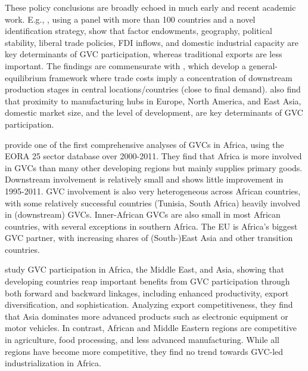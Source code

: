 \documentclass[a4paper]{article}
\begin{document}
These policy conclusions are broadly echoed in much early and recent academic work. E.g., \citet{fernandes2022determinants}, using a panel with more than 100 countries and a novel identification strategy, show that factor endowments, geography, political stability, liberal trade policies, FDI inflows, and domestic industrial capacity are key determinants of GVC participation, whereas traditional exports are less important. The findings are commensurate with \citet{antras2020geography}, which develop a general-equilibrium framework where trade costs imply a concentration of downstream production stages in central locations/countries (close to final demand). \citet{kowalski2015participation} also find that proximity to manufacturing hubs in Europe, North America, and East Asia, domestic market size, and the level of development, are key determinants of GVC participation. \newline
  
 \citet{foster2015global} provide one of the first comprehensive analyses of GVCs in Africa, using the EORA 25 sector database over 2000-2011. They find that Africa is more involved in GVCs than many other developing regions but mainly supplies primary goods. Downstream involvement is relatively small and shows little improvement in 1995-2011. GVC involvement is also very heterogeneous across African countries, with some relatively successful countries (Tunisia, South Africa) heavily involved in (downstream) GVCs. Inner-African GVCs are also small in most African countries, with several exceptions in southern Africa. The EU is Africa's biggest GVC partner, with increasing shares of (South-)East Asia and other transition countries. \newline

\citet{kowalski2015participation} study GVC participation in Africa, the Middle East, and Asia, showing that developing countries reap important benefits from GVC participation through both forward and backward linkages, including enhanced productivity, export diversification, and sophistication. Analyzing export competitiveness, they find that Asia dominates more advanced products such as electronic equipment or motor vehicles. In contrast, African and Middle Eastern regions are competitive in agriculture, food processing, and less advanced manufacturing. While all regions have become more competitive, they find no trend towards GVC-led industrialization in Africa. \newline 
\end{document}
